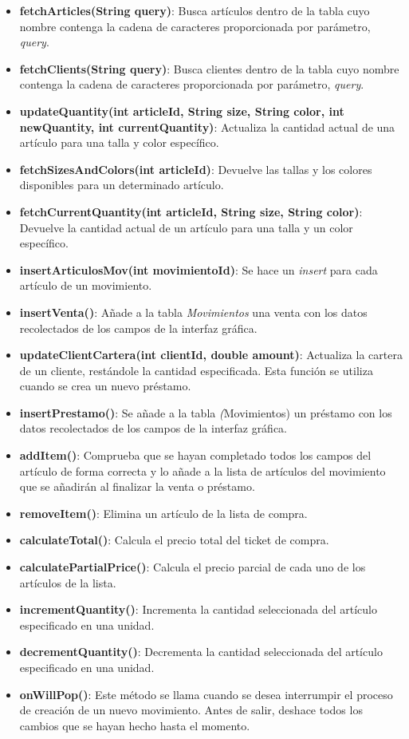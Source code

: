 \begin{itemize}
	\item \textbf{fetchArticles(String query)}: Busca artículos dentro de la tabla cuyo nombre contenga la cadena de caracteres proporcionada por parámetro, \textit{query}. 
	\item \textbf{fetchClients(String query)}:  Busca clientes dentro de la tabla cuyo nombre contenga la cadena de caracteres proporcionada por parámetro, \textit{query}. 
	\item \textbf{updateQuantity(int articleId, String size, String color, int newQuantity, int currentQuantity)}: Actualiza la cantidad actual de una artículo para una talla y color específico. 
	\item \textbf{fetchSizesAndColors(int articleId)}: Devuelve las tallas y los colores disponibles para un determinado artículo. 
	\item \textbf{fetchCurrentQuantity(int articleId, String size, String color)}: Devuelve la cantidad actual de un artículo para una talla y un color específico. 
	\item \textbf{insertArticulosMov(int movimientoId)}: Se hace un \textit{insert} para cada artículo de un movimiento. 
	\item \textbf{insertVenta()}: Añade a la tabla \textit{Movimientos} una venta con los datos recolectados de los campos de la interfaz gráfica. 
	\item \textbf{updateClientCartera(int clientId, double amount)}: Actualiza la cartera de un cliente, restándole la cantidad especificada. Esta función se utiliza cuando se crea un nuevo préstamo. 
	\item \textbf{insertPrestamo()}:  Se añade a la tabla \textit(Movimientos) un préstamo con los datos recolectados de los campos de la interfaz gráfica.
	\item \textbf{addItem()}: Comprueba que se hayan completado todos los campos del artículo de forma correcta y lo añade a la lista de artículos del movimiento que se añadirán al finalizar la venta o préstamo. 
	\item \textbf{removeItem()}: Elimina un artículo de la lista de compra. 
	\item \textbf{calculateTotal()}: Calcula el precio total del ticket de compra. 
	\item \textbf{calculatePartialPrice()}: Calcula el precio parcial de cada uno de los artículos de la lista. 
	\item \textbf{incrementQuantity()}: Incrementa la cantidad seleccionada del artículo especificado en una unidad. 
	\item \textbf{decrementQuantity()}: Decrementa la cantidad seleccionada del artículo especificado en una unidad. 
	\item \textbf{onWillPop()}: Este método se llama cuando se desea interrumpir el proceso de creación de un nuevo movimiento. Antes de salir, deshace todos los cambios que se hayan hecho hasta el momento.   
\end{itemize}


